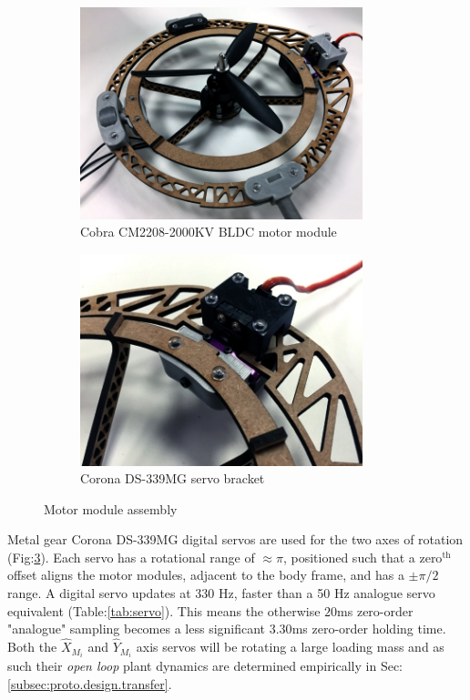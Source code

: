 \begin{figure}[htbp]
\centering
\begin{subfigure}{0.49\textwidth}
\centering
\includegraphics[width=0.9\textwidth]{figs/motor-bldc}
\caption{Cobra CM2208-2000KV BLDC motor module}
\label{fig:bldc-motor}
\end{subfigure}
\begin{subfigure}{0.49\textwidth}
\centering
\includegraphics[width=0.9\textwidth]{figs/motor-servo}
\caption{Corona DS-339MG servo bracket}
\label{fig:motor-servo}
\end{subfigure}
\caption{Motor module assembly}
\end{figure}
\par
\vspace{-10pt}
Metal gear Corona DS-339MG digital servos are used for the two axes of rotation (Fig:\ref{fig:motor-servo}). Each servo has a rotational range of $\approx\pi$, positioned such that a $\text{zero}^{\text{th}}$ offset aligns the motor modules, adjacent to the body frame, and has a $\pm\pi/2$ range. A digital servo updates at 330 Hz, faster than a 50 Hz analogue servo equivalent (Table:\ref{tab:servo}). This means the otherwise $20$ms zero-order "analogue" sampling becomes a less significant $3.30$ms zero-order holding time. Both the $\hat{X}_{M_i}$ and $\hat{Y}_{M_i}$ axis servos will be rotating a large loading mass and as such their \emph{open loop} plant dynamics are determined empirically in Sec:\ref{subsec:proto.design.transfer}.
